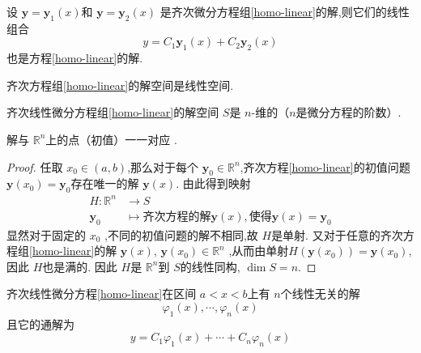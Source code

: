 \documentclass[lang=cn,12pt,color=green,fontset=none]{elegantbook}
\begin{document}
\begin{lemma}
    设 $ \mathbf{y}= \mathbf{y}_{1}\left( x \right)  $和 $ \mathbf{y}=\mathbf{y}_{2}\left( x \right)  $  是齐次微分方程组\eqref{homo-linear}的解,则它们的线性组合 
    \begin{equation}\label{solution}
          y= C_1 \mathbf{y}_{1}\left( x \right)+ C_2 \mathbf{y}_{2}\left( x \right)  
    \end{equation}也是方程\eqref{homo-linear}的解.
\end{lemma}
\begin{remark}
    齐次方程组\eqref{homo-linear}的解空间是线性空间.
\end{remark}
\begin{lemma}
    齐次线性微分方程组\eqref{homo-linear}的解空间 $ S $是 $ n $-维的（$ n $是微分方程的阶数）.   
\end{lemma}
\begin{remark}
    解与 $ \mathbb{R} ^{n} $上的点（初值）一一对应 .
\end{remark}
\begin{proof}
    任取 $ x_0 \in \left( a,b \right)  $,那么对于每个 $ \mathbf{y}_{0} \in  \mathbb{R} ^{n} $,齐次方程\eqref{homo-linear}的初值问题 $ \mathbf{y}\left( x_0 \right)=\mathbf{y}_{0}  $存在唯一的解 $ \mathbf{y}\left( x \right)  $.
    由此得到映射 $$
    \begin{aligned}
    H: \mathbb{R} ^{n} & \to  S
      \\ 
        \mathbf{y}_{0} &\mapsto \text{齐次方程的解}\mathbf{y}\left( x \right),\text{使得} \mathbf{y}\left( x \right)= \mathbf{y}_{0}  
    \end{aligned}
    $$  显然对于固定的 $ x_0 $ ,不同的初值问题的解不相同,故 $ H $是单射.
    又对于任意的齐次方程组\eqref{homo-linear}的解 $ \mathbf{y}\left( x \right)  $, $ \mathbf{y}\left( x_0 \right) \in \mathbb{R} ^{n}  $ ,从而由单射$ H\left( \mathbf{y}\left( x_0 \right)  \right)= \mathbf{y}\left( x_0 \right)   $,因此 $ H $也是满的.
    因此 $ H $是 $ \mathbb{R} ^{n} $到 $ S $的线性同构, $ \operatorname{dim}S=n     $.    
\end{proof}

\begin{theorem}\label{thm:lin-eq-gen-sol}
    齐次线性微分方程\eqref{homo-linear}在区间 $ a<x<b $上有 $ n $个线性无关的解 \begin{equation}\label{independent-solution}
        \varphi_1\left( x \right) ,\cdots ,\varphi_{n}\left( x \right) 
    \end{equation} 且它的通解为 \begin{equation}\label{general-solution}
        y = C_1\varphi_{1}\left( x \right)+ \cdots + C_{n}\varphi_{n}\left( x \right)  
    \end{equation}
   
    
\end{theorem}
\end{document}
